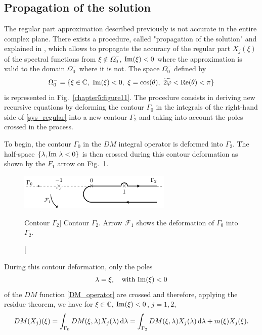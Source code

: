 \subsection{Propagation of the solution}
\label{propag_sol}
The regular part approximation described previously is not accurate in the entire complex plane. There exists a procedure, called "propagation of the solution" and explained in \cite{CroisilleLebeau}, which allows to propagate the accuracy of the regular part $X_j(\xi)$ of the spectral functions from $\xi \notin \Omega_0^-$, ${\rm Im} (\xi) <0$ where the approximation is valid to the domain $\Omega_0^-$ where it is not. The space $\Omega_0^-$ defined by
\begin{equation}
\label{defomegamoins}
\Omega_0^- = \{\xi \in \mathbb C, \ {\rm Im}(\xi) <0, \  \xi=\cos(\theta), \ \widetilde{2\varphi} < {\rm Re}(\theta)<\pi\}
\end{equation}
is represented in Fig.~\ref{chapter5:figure11}. 
The procedure consists in deriving new recursive equations by deforming the  contour $\Gamma_0$ in the integrals of the right-hand side of \eqref{sys_regular} into a new contour $\Gamma_2$ and taking into account the poles crossed in the process.

To begin, the contour $\Gamma_0$ in the $DM$ integral operator is deformed into $\Gamma_2$. The half-space $\{ \lambda, {\rm Im} \ \lambda < 0 \}$ is then crossed during this contour deformation as shown by the $F_1$ arrow on Fig.~\ref{chapter5:figure8}.

\begin{figure}[ht]%
\begin{center}
  \includegraphics[width=0.65\textwidth]{images/chapter2/Figure6.pdf}
\end{center}
\caption
[Contour $\Gamma_2$]
{Contour $\Gamma_2$. Arrow $\mathcal{F}_1$ shows the deformation of $\Gamma_0$ into $\Gamma_2$.}
\label{chapter5:figure8}
\end{figure}

During this contour deformation, only the poles
\begin{equation}
\lambda = \xi, \quad \text{with } {\rm Im}(\xi) <0 
\end{equation}
of the $DM$ function \eqref{DM_operator} are crossed and therefore, applying the residue theorem, we have for $\xi \in \mathbb{C}$, ${\rm Im}(\xi) <0$, $j=1,2$, 
\begin{equation}
\label{DM_propag_sol}
DM(X_j)(\xi) = \int_{\Gamma_0} DM(\xi,\lambda) X_j(\lambda) \, {\rm d} \lambda  = \int_{\Gamma_2} DM(\xi,\lambda) X_j(\lambda) \, {\rm d} \lambda + m(\xi) X_j(\xi).
\end{equation}


